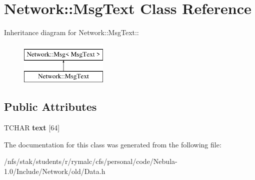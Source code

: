 \hypertarget{classNetwork_1_1MsgText}{
\section{Network::MsgText Class Reference}
\label{classNetwork_1_1MsgText}
}
Inheritance diagram for Network::MsgText::\begin{figure}[H]
\begin{center}
\leavevmode
\includegraphics[height=2cm]{classNetwork_1_1MsgText}
\end{center}
\end{figure}
\subsection*{Public Attributes}
\begin{DoxyCompactItemize}
\item 
\hypertarget{classNetwork_1_1MsgText_a1b45d6b2cbd76c59c45a983a803db266}{
TCHAR {\bfseries text} \mbox{[}64\mbox{]}}
\label{classNetwork_1_1MsgText_a1b45d6b2cbd76c59c45a983a803db266}

\end{DoxyCompactItemize}


The documentation for this class was generated from the following file:\begin{DoxyCompactItemize}
\item 
/nfs/stak/students/r/rymalc/cfs/personal/code/Nebula-\/1.0/Include/Network/old/Data.h\end{DoxyCompactItemize}

